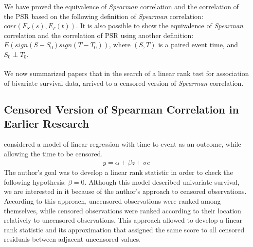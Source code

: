 \documentclass[]{article}
\begin{document}
We have proved the equivalence of \emph{Spearman} correlation and the correlation of the PSR based on the following definition of \emph{Spearman} correlation: $corr(F_S(s), F_T(t))$. It is also possible to show the equivalence of \emph{Spearman} correlation and the correlation of PSR using another definition: $E(sign(S-S_0)sign(T-T_0))$, where $(S,T)$ is a paired event time, and $S_0 \perp T_0$.\\
~\\
We now summarized papers that in the search of a linear rank test for association of bivariate survival data, arrived to a censored version of \emph{Spearman} correlation.


\subsection{Censored Version of Spearman Correlation in Earlier Research}

\cite{prentice1978linear}  considered a model of linear regression with time to event as an outcome, while allowing the time to be censored.
	$$
	\begin{aligned}
		y = \alpha + \beta z + \sigma e
	\end{aligned}
	$$
The author's goal was to develop a linear rank statistic in order to check the following hypothesis: $\beta = 0$. Although this model described univariate survival, we are interested in it because of the author's approach to censored observations.
According to this approach, uncensored observations were ranked among themselves, while censored observations were ranked according to their location relatively to uncensored observations. This approach allowed to develop a linear rank statistic and its approximation that assigned the same score to all censored residuals between adjacent uncensored values.\\
\end{document}
